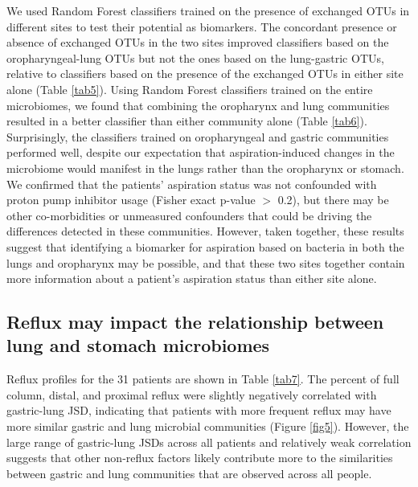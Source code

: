 We used Random Forest classifiers trained on the presence of exchanged OTUs in different sites to test their potential as biomarkers.
The concordant presence or absence of exchanged OTUs in the two sites improved classifiers based on the oropharyngeal-lung OTUs but not the ones based on the lung-gastric OTUs, relative to classifiers based on the presence of the exchanged OTUs in either site alone (Table \ref{tab5}).
Using Random Forest classifiers trained on the entire microbiomes, we found that combining the oropharynx and lung communities resulted in a better classifier than either community alone (Table \ref{tab6}).
Surprisingly, the classifiers trained on oropharyngeal and gastric communities performed well, despite our expectation that aspiration-induced changes in the microbiome would manifest in the lungs rather than the oropharynx or stomach.
We confirmed that the patients' aspiration status was not confounded with proton pump inhibitor usage (Fisher exact p-value $>$ 0.2), but there may be other co-morbidities or unmeasured confounders that could be driving the differences detected in these communities.
However, taken together, these results suggest that identifying a biomarker for aspiration based on bacteria in both the lungs and oropharynx may be possible, and that these two sites together contain more information about a patient's aspiration status than either site alone.

\FloatBarrier

\subsection{Reflux may impact the relationship between lung and stomach microbiomes}

Reflux profiles for the 31 patients are shown in Table \ref{tab7}.
The percent of full column, distal, and proximal reflux were slightly negatively correlated with gastric-lung JSD, indicating that patients with more frequent reflux may have more similar gastric and lung microbial communities (Figure \ref{fig5}).
However, the large range of gastric-lung JSDs across all patients and relatively weak correlation suggests that other non-reflux factors likely contribute more to the similarities between gastric and lung communities that are observed across all people.


